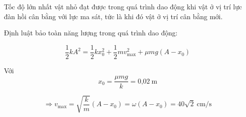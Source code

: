 \begin{enumerate}[label=\bfseries Câu \arabic*:]
{	Tốc độ lớn nhất vật nhỏ đạt được trong quá trình dao động khi vật ở vị trí lực đàn hồi cân bằng với lực ma sát, tức là khi đó vật ở vị trí cân bằng mới.
	
	Định luật bảo toàn năng lượng trong quá trình dao động:
	
	$$\dfrac{1}{2}kA^2=\dfrac{1}{2}kx_0^2+\dfrac{1}{2}mv_\text{max}^2+\mu mg(A-x_0)$$
	
	Với $$x_0=\dfrac{\mu mg}{k}=\text{0,02}\ \text{m}$$
	
	$$\Rightarrow v_\text{max}=\sqrt{\dfrac{k}{m}}\left(A-x_0\right)=\omega \left(A-x_0\right)=40\sqrt{2}\ \text{cm/s}$$
	
}	
	
\end{enumerate}
